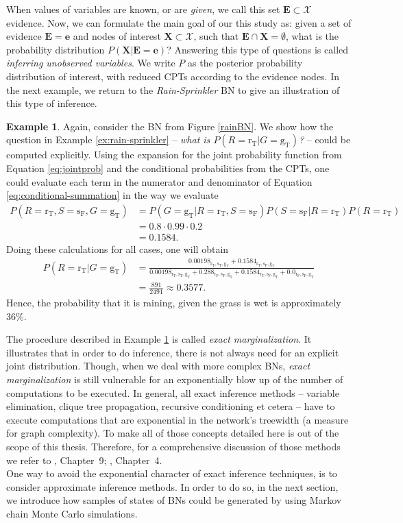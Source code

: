 \documentclass[a4paper, twoside, 11pt]{report}
\theoremstyle{plain}
\theoremstyle{definition}
\newtheorem{example}[thm]{Example}
\theoremstyle{remark}
\newcommand{\X}{{\mathcal{X}}}
\newcommand{\gT}{{\text{g}_\text{T} }}
\newcommand{\sT}{{\text{s}_\text{T} }}
\newcommand{\sF}{{\text{s}_\text{F} }}
\newcommand{\rT}{{\text{r}_\text{T} }}
\newcommand{\rF}{{\text{r}_\text{F} }}
\newcommand{\bfe}{{\mathbf{e}}}
\newcommand{\bfX}{{\mathbf{X}}}
\newcommand{\bfE}{{\mathbf{E}}}
\begin{document}
When values of variables are known, or are \textit{given}, we call this set $\bfE \subset \X$ evidence. Now, we can formulate the main goal of our this study as: given a set of evidence $\bfE = \bfe$ and nodes of interest $\bfX \subset \X$, such that $\bfE \cap \bfX = \emptyset$, what is the probability distribution $P(\bfX | \bfE = \bfe)$? Answering this type of questions is called \textit{inferring unobserved variables}. We write $P$ as the posterior probability distribution of interest, with reduced CPTs according to the evidence nodes. In the next example, we return to the \textit{Rain-Sprinkler} BN to give an illustration of this type of inference.
\begin{example}\label{ex:exact-marg}
Again, consider the BN from Figure \ref{rainBN}. We show how the question in Example \ref{ex:rain-sprinkler} -- \textit{what is $P(R = \text{r}_\text{T} | G = \text{g}_\text{T})$?} -- could be computed explicitly. Using the expansion for the joint probability function from Equation \ref{eq:jointprob} and the conditional probabilities from the CPTs, one could evaluate each term in the numerator and denominator of Equation \ref{eq:conditional-summation} in the way we evaluate
\begin{align*}
P(R = \rT, S = \sF, G = \gT) &= P(G = \gT | R = \rT, S = \sF) P(S = \sF | R = \rT) P(R = \rT) \\
&= 0.8 \cdot 0.99 \cdot 0.2 \\
&= 0.1584. 
\end{align*}
Doing these calculations for all cases, one will obtain
\begin{align*}
P(R = \rT | G = \gT) &= \frac{0.00198_{\rT, \sT, \gT} + 0.1584_{\rT, \sF, \gT} }{0.00198_{\rT, \sT, \gT} + 0.288_{\rF, \sT, \gT} + 0.1584_{\rT, \sF, \gT} + 0.0_{\rF, \sF, \gT}}\\
& = \frac{891}{2491} \approx 0.3577.
\end{align*}
Hence, the probability that it is raining, given the grass is wet is approximately 36\%.
\end{example}
The procedure described in Example \ref{ex:exact-marg} is called \textit{exact marginalization}. It illustrates that in order to do inference, there is not always need for an explicit joint distribution. Though, when we deal with more complex BNs, \textit{exact marginalization} is still vulnerable for an exponentially blow up of the number of computations to be executed. In general, all exact inference methods -- variable elimination, clique tree propagation, recursive conditioning et cetera -- have to execute computations that are exponential in the network's treewidth (a measure for graph complexity). To make all of those concepts detailed here is out of the scope of this thesis. Therefore, for a comprehensive discussion of those methods we refer to \cite{koller2009probabilistic}, Chapter~9; \cite{nielsen2009bayesian}, Chapter~4. \\
One way to avoid the exponential character of exact inference techniques, is to consider approximate inference methods. In order to do so, in the next section, we introduce how samples of states of BNs could be generated by using Markov chain Monte Carlo simulations.
\end{document}
